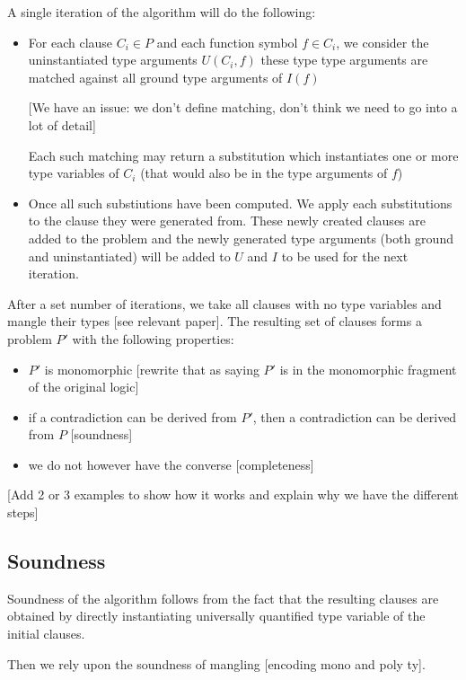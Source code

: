 \documentclass[]{ceurart}
\begin{document}
A single iteration of the algorithm will do the following:
\begin{itemize}
   \item For each clause \(C_i \in P\) and each function symbol \(f \in C_i\), we consider the uninstantiated type arguments \(U(C_i, f)\) these type type arguments are matched against all ground type arguments of \(I(f)\)

      [We have an issue: we don't define matching, don't think we need to go into a lot of detail]

      Each such matching may return a substitution which instantiates one or more type variables of \(C_i\) (that would also be in the type arguments of \(f\))

   \item Once all such substiutions have been computed. We apply each substitutions to the clause they were generated from. These newly created clauses are added to the problem and the newly generated type arguments (both ground and uninstantiated) will be added to \(U\) and \(I\) to be used for the next iteration.
\end{itemize}

After a set number of iterations, we take all clauses with no type variables and mangle their types [see relevant paper]. The resulting set of clauses forms a problem \(P'\) with the following properties:
\begin{itemize}
   \item \(P'\) is monomorphic [rewrite that as saying \(P'\) is in the monomorphic fragment of the original logic]
   \item if a contradiction can be derived from \(P'\), then a contradiction can be derived from \(P\) [soundness]
   \item we do not however have the converse [completeness]
\end{itemize}

[Add 2 or 3 examples to show how it works and explain why we have the different steps]

\subsection{Soundness}
Soundness of the algorithm follows from the fact that the resulting clauses are obtained by directly instantiating universally quantified type variable of the initial clauses.

Then we rely upon the soundness of mangling [encoding mono and poly ty].
\end{document}
